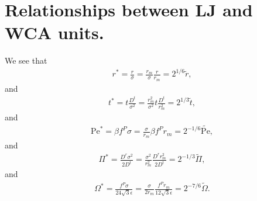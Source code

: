 \documentclass[twocolumn,amsmath,amssymb,aps]{revtex4-1}%
\begin{document}
\section{Relationships between LJ and WCA units.}

We see that
\begin{align}
  r^* = \frac{r}{\sigma} = \frac{r_m}{\sigma}\frac{r}{r_m}
  = 2^{1/6} \tilde{r},
\end{align}
and
\begin{align}
  t^* = t\frac{D^t}{\sigma^2} = \frac{r_m^2}{\sigma^2}t\frac{D^t}{r_m^2}
  = 2^{1/3} \tilde{t},
\end{align}
and
\begin{align}
  \mathrm{Pe}^* = \beta f^P \sigma = \frac{\sigma}{r_m}\beta f^P r_m
  = 2^{-1/6}\tilde{\mathrm{Pe}},
\end{align}
and
\begin{align}
  \Pi^* = \frac{D^r\sigma^2}{2D^t}
  = \frac{\sigma^2}{r_m^2}\frac{D^rr_m^2}{2D^t}
  = 2^{-1/3}\tilde{\Pi},
\end{align}
and
\begin{align}
  \Omega^*  = \frac{f^P \sigma}{24\sqrt{3}\epsilon}
  =\frac{\sigma}{2r_m}\frac{f^P r_m}{12\sqrt{3}\epsilon}
  =2^{-7/6}\tilde{\Omega}.
\end{align}
\end{document}
